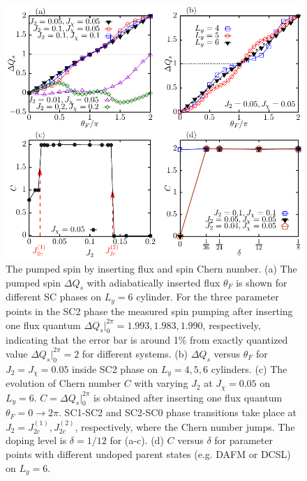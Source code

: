 \documentclass[aps,prx,reprint,superscriptaddress,showpacs]{revtex4-2}
\begin{document}
\begin{figure}
\centering
\includegraphics[width=1\linewidth]{Chern.pdf}
\caption{The pumped spin by inserting flux and spin Chern number. (a) The pumped spin $\Delta Q_{s}$ with adiabatically inserted flux $\theta_{F}$ is shown for different SC phases  on $L_{y}=6$ cylinder. For the three parameter points in the SC2 phase the measured spin pumping after inserting one flux quantum $\Delta Q_s|_0^{2\pi}=1.993, 1.983, 1.990$, respectively, indicating that the error bar is around 1\% from exactly quantized value $\Delta Q_s|_0^{2\pi}=2$ for different systems. (b) $\Delta Q_s$ versus $\theta_F$ for $J_{2}=J_{\chi}=0.05$ inside SC2 phase on $L_{y}=4, 5, 6$ cylinders. (c) The evolution of Chern number $C$ with varying $J_{2}$ at $J_{\chi }=0.05$ on $L_{y}=6$. $C=\Delta Q_s|_0^{2\pi}$ is obtained after inserting one flux quantum $\theta_F=0\rightarrow 2\pi$.  SC1-SC2 and SC2-SC0 phase transitions take place at $J_{2}=J_{2c}^{(1)},J_{2c}^{(2)}$, respectively, where  the  Chern number jumps.  The doping level is $\delta=1/12$ for (a-c). (d) $C$ versus $\delta$ for parameter points with different undoped parent states (e.g. DAFM or DCSL) on $L_{y}=6$.}
\label{Fig_flux_insertion}
\end{figure}
\end{document}

